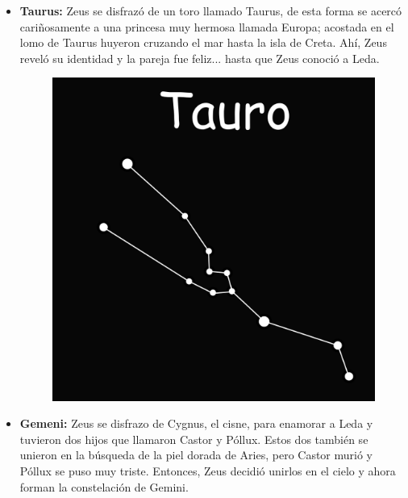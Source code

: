 \documentclass[10pt,a4paper]{article}
\begin{document}
\begin{itemize}
 \item \textbf{Taurus:} Zeus se disfrazó de un toro llamado Taurus, de esta forma se acercó cariñosamente a una princesa muy hermosa llamada Europa; acostada en el lomo de Taurus huyeron cruzando el mar hasta la isla de Creta. Ahí, Zeus reveló su identidad y la pareja fue feliz... hasta que Zeus conoció a Leda.
 
\begin{figure}[H]
\centering
\includegraphics[scale=0.18]{Imagenes/Tauro_01}
\end{figure} 

 \item \textbf{Gemeni:} Zeus se disfrazo de Cygnus, el cisne, para enamorar a Leda y tuvieron dos hijos que llamaron Castor y Póllux. Estos dos también se unieron en la búsqueda de la piel dorada de Aries, pero Castor murió y Póllux se puso muy triste. Entonces, Zeus decidió unirlos en el cielo y ahora forman la constelación de Gemini.
 

\end{itemize}
\end{document}
